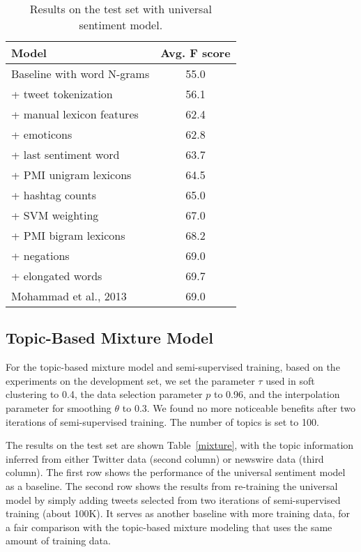 \documentclass[11pt]{article}
\begin{document}
\begin{table}[h]
\begin{center}
\begin{tabular}{|l|c|}
\hline \bf Model & \bf Avg. F score \\ \hline\hline
Baseline with word N-grams & 55.0 \\ \hline
+ tweet tokenization & 56.1 \\ \hline
+ manual lexicon features & 62.4 \\ \hline
+ emoticons & 62.8 \\ \hline
+ last sentiment word & 63.7 \\ \hline
+ PMI unigram lexicons & 64.5 \\ \hline
+ hashtag counts & 65.0 \\ \hline
+ SVM weighting & 67.0 \\ \hline
+ PMI bigram lexicons & 68.2 \\ \hline
+ negations & 69.0 \\ \hline
+ elongated words & 69.7 \\ \hline\hline
Mohammad et al., 2013 & 69.0 \\ \hline
\end{tabular}
\end{center}
\caption{\label{universal} Results on the test set with universal sentiment model.}
\end{table}

\subsection{Topic-Based Mixture Model}

For the topic-based mixture model and semi-supervised training, based on the experiments on the development set,
we set the parameter $\tau$ used in soft clustering to 0.4, the data selection parameter $p$ to 0.96, and the 
interpolation parameter for smoothing $\theta$ to 0.3. We found no more noticeable benefits after two iterations
of semi-supervised training. The number of topics is set to 100.

The results on the test set are shown Table~\ref{mixture}, with the topic information
inferred from either Twitter data (second column) or newswire data (third column).
The first row shows the performance of the universal sentiment model as a baseline.
The second row shows the results from re-training the universal model by simply adding tweets
selected from two iterations of semi-supervised training (about 100K). It serves as another
baseline with more training data, for a fair comparison with the topic-based mixture modeling that uses
the same amount of training data. 
\end{document}
